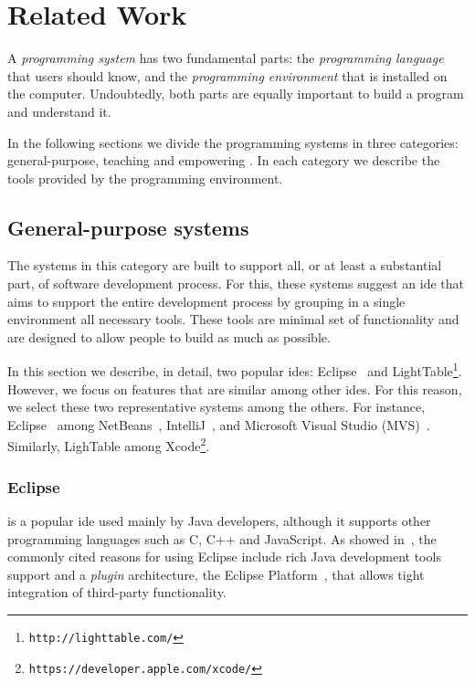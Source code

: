 
% 
% 

\section{Related Work}
\label{sec:rw}
A \textit{programming system} has two fundamental parts: the \textit{programming language} that users should know, and the \textit{programming environment} that is installed on the computer. Undoubtedly, both parts are equally important to build a program and understand it.

In the following sections we divide the programming systems in three categories: general-purpose, teaching and empowering . In each category we describe the tools provided by the programming environment.
\subsection{General-purpose systems}

The systems in this category are built to support all, or at least a substantial part, of software development process. For this, these systems suggest an \ac{ide} that aims to support the entire development process by grouping in a single environment all necessary tools. These tools are minimal set of functionality and are designed to allow people to build as much as possible.

In this section we describe, in detail, two popular \ac{ide}s: Eclipse~\cite{carlson2005eclipse} and LightTable\footnote{\texttt{http://lighttable.com/}}. However, we focus on features that are similar among other \ac{ide}s. For this reason, we select these two representative systems among the others. For instance, Eclipse~\cite{carlson2005eclipse} among NetBeans~\cite{boudreau2002netbeans}, IntelliJ~\cite{intellij2001intellij}, and Microsoft Visual Studio (MVS)~\cite{guckenheimer2006software}. Similarly, LighTable among Xcode\footnote{\texttt{https://developer.apple.com/xcode/}}.
\subsubsection{Eclipse~\cite{carlson2005eclipse}} is a popular \ac{ide} used mainly by Java developers, although it supports other programming languages such as C, C++ and JavaScript. As showed in~\cite{murphy2006java}, the commonly cited reasons for using Eclipse include rich Java development tools support and a \textit{plugin} architecture, the Eclipse Platform~\cite{DesRivieres2004}, that allows tight integration of third-party functionality.


